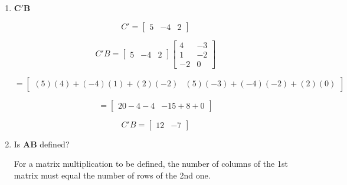 \documentclass[12pt]{article}
\begin{document}
\begin{enumerate}
$$
A'B'
=
\begin{bmatrix}
-1 & 4\\
3 & 2
\end{bmatrix}
\begin{bmatrix}
4 & 1 & -2\\
-3 & -2 & 0
\end{bmatrix}
$$

$$
=
\begin{bmatrix}
(-1)(4)+(4)(-3) & (-1)(1)+(4)(-2) & (-1)(-2)+(4)(0)\\
(3)(4)+(2)(-3) & (3)(1)+(2)(-2) & (3)(-2)+(2)(0)
\end{bmatrix}
$$

$$
=
\begin{bmatrix}
-4-12 & -1-8 & 2+0\\
12-6 & 3-4 & -6+0
\end{bmatrix}
$$

$$
\boxed{
A'B'
=
\begin{bmatrix}
-16 & -9 & 2\\
6 & -1 & -6
\end{bmatrix}
}
$$

\item[(d)] $\mathbf{C}'\mathbf{B}$

$$
C'
=
\begin{bmatrix}
5 & -4 & 2
\end{bmatrix}
$$

$$
C'B
=
\begin{bmatrix}
5 & -4 & 2
\end{bmatrix}
\begin{bmatrix}
4 & -3\\
1 & -2\\
-2 & 0
\end{bmatrix}
$$

$$
=
\begin{bmatrix}
(5)(4)+(-4)(1)+(2)(-2)
&
(5)(-3)+(-4)(-2)+(2)(0)
\end{bmatrix}
$$

$$
=
\begin{bmatrix}
20-4-4 & -15+8+0
\end{bmatrix}
$$

$$
\boxed{
C'B=
\begin{bmatrix}
12 & -7
\end{bmatrix}
}
$$

\item[(e)] Is $\mathbf{A}\mathbf{B}$ defined?

\noindent For a matrix multiplication to be defined, the number of columns of the 1st matrix must equal the number of rows of the 2nd one.


\end{enumerate}
\end{document}
